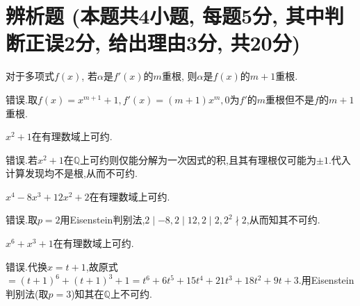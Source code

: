 \documentclass{exam-zh}
\begin{document}
\section{辨析题 (本题共4小题, 每题5分, 其中判断正误2分, 给出理由3分, 共20分)}
\begin{question}
    对于多项式$f(x)$, 若$\alpha$是$f'(x)$的$m$重根, 则$\alpha$是$f(x)$的$m+1$重根.
\end{question}
\begin{solution}
    错误.取$f(x)=x^{m+1}+1, f'(x)=(m+1)x^m, 0$为$f'$的$m$重根但不是$f$的$m+1$重根.
\end{solution}
\begin{question}
    $x^2+1$在有理数域上可约.
\end{question}
\begin{solution}
    错误.若$x^2+1$在$\mathbb{Q}$上可约则仅能分解为一次因式的积,且其有理根仅可能为$\pm 1$.代入计算发现均不是根,从而不可约.
\end{solution}
\begin{question}
    $x^4-8x^3+12x^2+2$在有理数域上可约.
\end{question}
\begin{solution}
    错误.取$p=2$用Eisenstein判别法,$2\mid -8, 2\mid 12, 2\mid 2, 2^2\nmid 2$,从而知其不可约.
\end{solution}
\begin{question}
    $x^6+x^3+1$在有理数域上可约.
\end{question}
\begin{solution}
    错误.代换$x=t+1$,故原式$=(t+1)^6+(t+1)^3+1=t^6+6 t^5+15 t^4+21 t^3+18 t^2+9 t+3$.用Eisenstein判别法(取$p=3$)知其在$\mathbb{Q}$上不可约.
\end{solution}

\newpage
\end{document}
